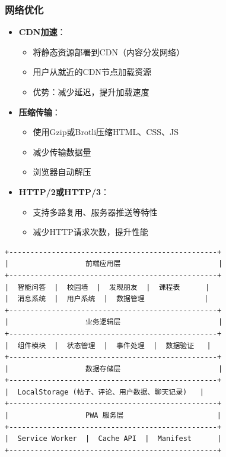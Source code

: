 \documentclass[12pt,a4paper]{article}
\begin{document}
\subsubsection{网络优化}
\begin{itemize}
    \item \textbf{CDN加速}：
        \begin{itemize}
            \item 将静态资源部署到CDN（内容分发网络）
            \item 用户从就近的CDN节点加载资源
            \item 优势：减少延迟，提升加载速度
        \end{itemize}
    \item \textbf{压缩传输}：
        \begin{itemize}
            \item 使用Gzip或Brotli压缩HTML、CSS、JS
            \item 减少传输数据量
            \item 浏览器自动解压
        \end{itemize}
    \item \textbf{HTTP/2或HTTP/3}：
        \begin{itemize}
            \item 支持多路复用、服务器推送等特性
            \item 减少HTTP请求次数，提升性能
        \end{itemize}
\end{itemize}

\begin{verbatim}
+-------------------------------------------------+
|                  前端应用层                       |
+-------------------------------------------------+
|  智能问答  |  校园墙  |  发现朋友  |  课程表      |
|  消息系统  |  用户系统  |  数据管理              |
+-------------------------------------------------+
|                  业务逻辑层                       |
+-------------------------------------------------+
|  组件模块  |  状态管理  |  事件处理  |  数据验证   |
+-------------------------------------------------+
|                  数据存储层                       |
+-------------------------------------------------+
|  LocalStorage (帖子、评论、用户数据、聊天记录)   |
+-------------------------------------------------+
|                  PWA 服务层                      |
+-------------------------------------------------+
|  Service Worker  |  Cache API  |  Manifest      |
+-------------------------------------------------+
\end{verbatim}
\end{document}
